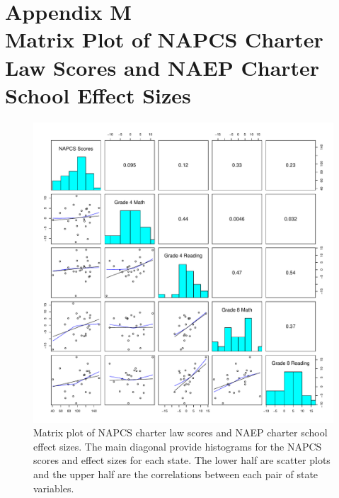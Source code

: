 \begin{singlespace}
\begin{landscape}

\end{landscape}
\end{singlespace}

{}
\section*{Appendix M\\Matrix Plot of NAPCS Charter Law Scores and NAEP Charter School Effect Sizes}
\label{appendixM}

\begin{figure}[h!]
\begin{center}
\includegraphics[width=\textwidth]{../Figures2009/NAEPLawScoresMatrixPlot.pdf}
\caption[Matrix plot of NAPCS charter law scores and NAEP charter school effect sizes]{Matrix plot of NAPCS charter law scores and NAEP charter school effect sizes. The main diagonal provide histograms for the NAPCS scores and effect sizes for each state. The lower half are scatter plots and the upper half are the correlations between each pair of state variables.}
\end{center}
\end{figure}



